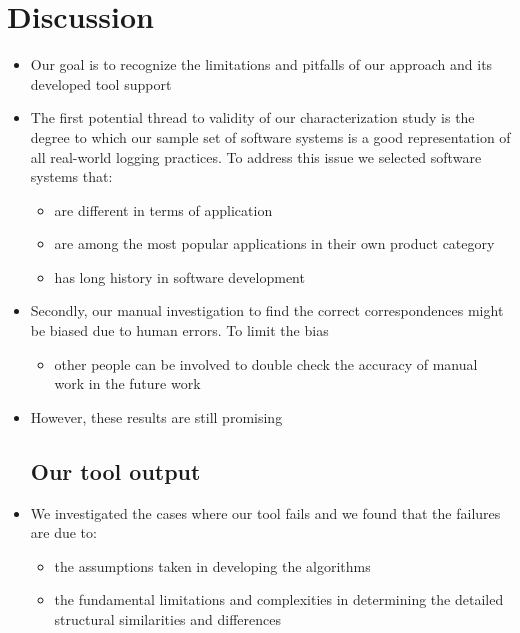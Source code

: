 \chapter{Discussion}  \label{diss}
\begin{itemize} [leftmargin=.01in]
\section{Threats to validity}  \label{threads}
\item Our goal is to recognize the limitations and pitfalls of our approach and its developed tool support
\item The first potential thread to validity of our characterization study is the degree to which our sample set of software systems is a good representation of all real-world logging practices. To address this issue we selected software systems that:
\begin{itemize} [leftmargin=.3in]
\item are different in terms of application
\item are among the most popular applications in their own product category
\item has long history in software development
\end{itemize}
\item Secondly, our manual investigation to find the correct correspondences might be biased due to human errors. To limit the bias
\begin{itemize} [leftmargin=.3in]
\item other people can be involved to double check the accuracy of manual work in the future work
\end{itemize}
\item However, these results are still promising

\section{Our tool output}  \label{output}
\item We investigated the cases where our tool fails and we found that the failures are due to:
\begin{itemize} [leftmargin=.3in]
\item the assumptions taken in developing the algorithms
\item the fundamental limitations and complexities in determining the detailed structural similarities and differences
\end{itemize}


\end{itemize}
